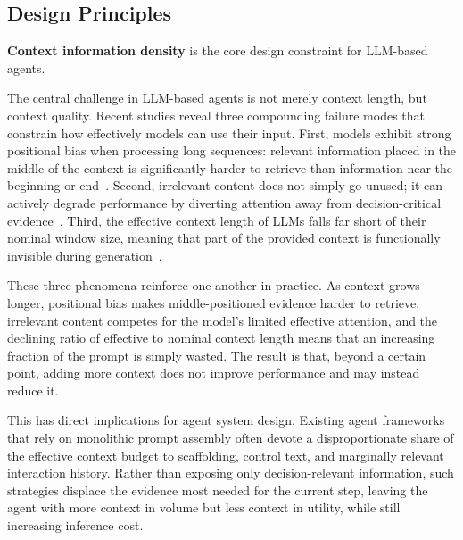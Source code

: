 \subsection{Design Principles}
\label{sec:principle}
\begin{AIbox}
\textbf{Context information density} is the core design constraint for LLM-based agents.
\end{AIbox}

The central challenge in LLM-based agents is not merely context length, but context quality. Recent studies reveal three compounding failure modes that constrain how effectively models can use their input. First, models exhibit strong positional bias when processing long sequences: relevant information placed in the middle of the context is significantly harder to retrieve than information near the beginning or end~\citep{liu2023lostmiddlelanguagemodels}. Second, irrelevant content does not simply go unused; it can actively degrade performance by diverting attention away from decision-critical evidence~\citep{shi2023largelanguagemodelseasily}. Third, the effective context length of LLMs falls far short of their nominal window size, meaning that part of the provided context is functionally invisible during generation~\citep{an2024doeseffectivecontextlength}.

These three phenomena reinforce one another in practice. As context grows longer, positional bias makes middle-positioned evidence harder to retrieve, irrelevant content competes for the model's limited effective attention, and the declining ratio of effective to nominal context length means that an increasing fraction of the prompt is simply wasted. The result is that, beyond a certain point, adding more context does not improve performance and may instead reduce it.

This has direct implications for agent system design. Existing agent frameworks that rely on monolithic prompt assembly often devote a disproportionate share of the effective context budget to scaffolding, control text, and marginally relevant interaction history. Rather than exposing only decision-relevant information, such strategies displace the evidence most needed for the current step, leaving the agent with more context in volume but less context in utility, while still increasing inference cost.


